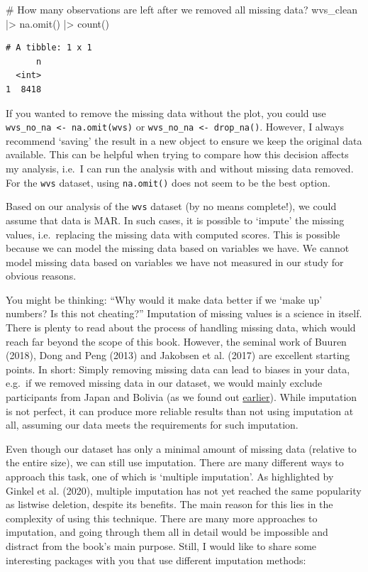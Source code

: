 \documentclass[
  letterpaper,
]{krantz}
\makeatletter
\newenvironment{Shaded}{\begin{snugshade}}{\end{snugshade}}
\newcommand{\CommentTok}[1]{\textcolor[rgb]{0.37,0.37,0.37}{#1}}
\newcommand{\FunctionTok}[1]{\textcolor[rgb]{0.28,0.35,0.67}{#1}}
\newcommand{\NormalTok}[1]{\textcolor[rgb]{0.00,0.23,0.31}{#1}}
\newcommand{\SpecialCharTok}[1]{\textcolor[rgb]{0.37,0.37,0.37}{#1}}
\newenvironment{kframe}{%
\medskip{}
\setlength{\fboxsep}{.8em}
 \def\at@end@of@kframe{}%
 \ifinner\ifhmode%
  \def\at@end@of@kframe{\end{minipage}}%
  \begin{minipage}{\columnwidth}%
 \fi\fi%
 \def\FrameCommand##1{\hskip\@totalleftmargin \hskip-\fboxsep
 \colorbox{shadecolor}{##1}\hskip-\fboxsep
     \hskip-\linewidth \hskip-\@totalleftmargin \hskip\columnwidth}%
 \MakeFramed {\advance\hsize-\width
   \@totalleftmargin\z@ \linewidth\hsize
   \@setminipage}}%
 {\par\unskip\endMakeFramed%
 \at@end@of@kframe}
\renewenvironment{Shaded}{\begin{kframe}}{\end{kframe}}
\makeatother
\begin{document}
\begin{Shaded}
\begin{Highlighting}[]
\CommentTok{\# How many observations are left after we removed all missing data?}
\NormalTok{wvs\_clean }\SpecialCharTok{|\textgreater{}} \FunctionTok{na.omit}\NormalTok{() }\SpecialCharTok{|\textgreater{}} \FunctionTok{count}\NormalTok{()}
\end{Highlighting}
\end{Shaded}

\begin{verbatim}
# A tibble: 1 x 1
      n
  <int>
1  8418
\end{verbatim}

If you wanted to remove the missing data without the plot, you could use
\texttt{wvs\_no\_na\ \textless{}-\ na.omit(wvs)} or
\texttt{wvs\_no\_na\ \textless{}-\ drop\_na()}. However, I always
recommend `saving' the result in a new object to ensure we keep the
original data available. This can be helpful when trying to compare how
this decision affects my analysis, i.e.~I can run the analysis with and
without missing data removed. For the \texttt{wvs} dataset, using
\texttt{na.omit()} does not seem to be the best option.

Based on our analysis of the \texttt{wvs} dataset (by no means
complete!), we could assume that data is MAR. In such cases, it is
possible to `impute' the missing values, i.e.~replacing the missing data
with computed scores. This is possible because we can model the missing
data based on variables we have. We cannot model missing data based on
variables we have not measured in our study for obvious reasons.

You might be thinking: ``Why would it make data better if we `make up'
numbers? Is this not cheating?'' Imputation of missing values is a
science in itself. There is plenty to read about the process of handling
missing data, which would reach far beyond the scope of this book.
However, the seminal work of Buuren (2018), Dong and Peng (2013) and
Jakobsen et al. (2017) are excellent starting points. In short: Simply
removing missing data can lead to biases in your data, e.g.~if we
removed missing data in our dataset, we would mainly exclude
participants from Japan and Bolivia (as we found out
\hyperref[missing-data-by-country-table]{earlier}). While imputation is
not perfect, it can produce more reliable results than not using
imputation at all, assuming our data meets the requirements for such
imputation.

Even though our dataset has only a minimal amount of missing data
(relative to the entire size), we can still use imputation. There are
many different ways to approach this task, one of which is `multiple
imputation'. As highlighted by Ginkel et al. (2020), multiple imputation
has not yet reached the same popularity as listwise deletion, despite
its benefits. The main reason for this lies in the complexity of using
this technique. There are many more approaches to imputation, and going
through them all in detail would be impossible and distract from the
book's main purpose. Still, I would like to share some interesting
packages with you that use different imputation methods:
\end{document}
